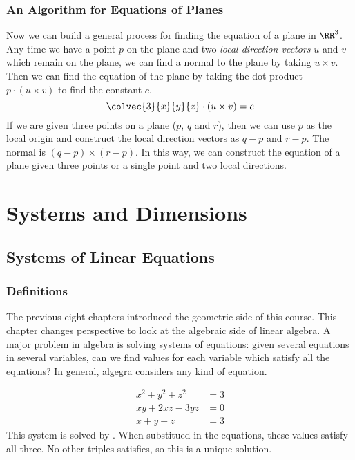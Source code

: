 \documentclass[fleqn]{report}
\begin{document}
\subsection{An Algorithm for Equations of Planes}
\label{planes-algorithm}

Now we can build a general process for finding the
equation of a plane in $\RR^3$. Any time we have a point $p$
on the plane and two \emph{local direction vectors} $u$ and
$v$ which remain on the plane, we can find a normal to the
plane by taking $u \times v$. Then we can find the equation
of the plane by taking the dot product $p \cdot (u \times v)$
to find the constant $c$. 
\begin{displaymath}
\colvec{3}{x}{y}{z} \cdot (u \times v) = c
\end{displaymath} 
If we are given three points on a plane ($p$, $q$ and $r$), then
we can use $p$ as the local origin and construct the local
direction vectors as $q-p$ and $r-p$. The normal is $(q-p)
\times (r-p)$. In this way, we can construct the equation of a
plane given three points or a single point and two local
directions.

\chapter{Systems and Dimensions}
\label{systems-and-dimensions}

\section{Systems of Linear Equations}
\label{systems}

\subsection{Definitions}
\label{systems_definition}

The previous eight chapters introduced the geometric side of
this course. This chapter changes perspective to look at the
algebraic side of linear algebra.
A major problem in algebra is solving systems of
equations: given several equations in several variables, can we 
find values for each variable which satisfy all the equations?
In general, algegra considers any kind of equation. 

\begin{example}
\begin{align*}
x^2 + y^2 + z^2 & = 3 \\
xy + 2xz - 3yz & = 0 \\
x+y+z & = 3
\end{align*}
This system is solved by . 
When substitued in the equations, these values satisfy all
three. No other triples satisfies, so this is a unique
solution.
\end{example}
\end{document}
